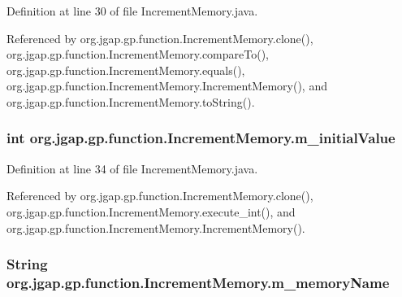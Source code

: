 Definition at line 30 of file Increment\-Memory.\-java.



Referenced by org.\-jgap.\-gp.\-function.\-Increment\-Memory.\-clone(), org.\-jgap.\-gp.\-function.\-Increment\-Memory.\-compare\-To(), org.\-jgap.\-gp.\-function.\-Increment\-Memory.\-equals(), org.\-jgap.\-gp.\-function.\-Increment\-Memory.\-Increment\-Memory(), and org.\-jgap.\-gp.\-function.\-Increment\-Memory.\-to\-String().

\hypertarget{classorg_1_1jgap_1_1gp_1_1function_1_1_increment_memory_a546ae2009d63f26cbb1e593199c0b8e8}{
\subsubsection[{m\-\_\-initial\-Value}]{\setlength{\rightskip}{0pt plus 5cm}int org.\-jgap.\-gp.\-function.\-Increment\-Memory.\-m\-\_\-initial\-Value\hspace{0.3cm}{\ttfamily [private]}}}\label{classorg_1_1jgap_1_1gp_1_1function_1_1_increment_memory_a546ae2009d63f26cbb1e593199c0b8e8}


Definition at line 34 of file Increment\-Memory.\-java.



Referenced by org.\-jgap.\-gp.\-function.\-Increment\-Memory.\-clone(), org.\-jgap.\-gp.\-function.\-Increment\-Memory.\-execute\-\_\-int(), and org.\-jgap.\-gp.\-function.\-Increment\-Memory.\-Increment\-Memory().

\hypertarget{classorg_1_1jgap_1_1gp_1_1function_1_1_increment_memory_af5b929df1231d94ec406c97e581ccbd3}{
\subsubsection[{m\-\_\-memory\-Name}]{\setlength{\rightskip}{0pt plus 5cm}String org.\-jgap.\-gp.\-function.\-Increment\-Memory.\-m\-\_\-memory\-Name\hspace{0.3cm}{\ttfamily [private]}}}\label{classorg_1_1jgap_1_1gp_1_1function_1_1_increment_memory_af5b929df1231d94ec406c97e581ccbd3}



